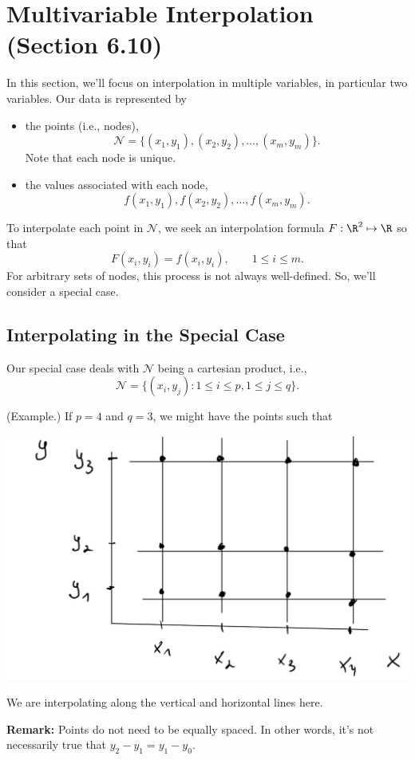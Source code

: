 \documentclass[letterpaper]{article}
\begin{document}
\section{Multivariable Interpolation (Section 6.10)}
In this section, we'll focus on interpolation in multiple variables, in particular two variables. Our data is represented by 
\begin{itemize}
    \item the points (i.e., nodes), 
    \[\mathcal{N} = \{(x_1, y_1), (x_2, y_2), \hdots, (x_m, y_m)\}.\]
    Note that each node is unique.

    \item the values associated with each node, 
    \[f(x_{1}, y_{1}), f(x_{2}, y_{2}), \hdots, f(x_{m}, y_{m}).\]
\end{itemize}
To interpolate each point in $\mathcal{N}$, we seek an interpolation formula $F: \R^{2} \mapsto \R$ so that \[F(x_i, y_i) = f(x_i, y_i), \qquad 1 \leq i \leq m.\]
For arbitrary sets of nodes, this process is not always well-defined. So, we'll consider a special case. 

\subsection{Interpolating in the Special Case}
Our special case deals with $\mathcal{N}$ being a cartesian product, i.e., 
\[\mathcal{N} = \{(x_i, y_j) : 1 \leq i \leq p, 1 \leq j \leq q\}.\]
\begin{mdframed}
    (Example.) If $p = 4$ and $q = 3$, we might have the points such that 
    
    \begin{center}
        \includegraphics[scale=0.6]{../assets/multi_inter.png}
    \end{center}
    We are interpolating along the vertical and horizontal lines here.
\end{mdframed}
\textbf{Remark:} Points do not need to be equally spaced. In other words, it's not necessarily true that $y_2 - y_1 = y_1 - y_0$.
\end{document}
